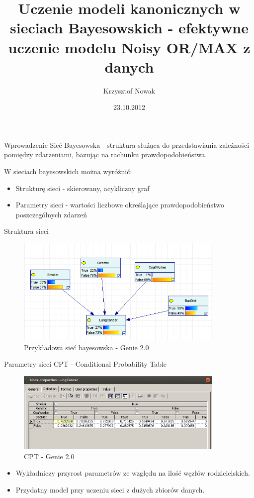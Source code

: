 \documentclass{beamer}
\title[Sieci Bayesowskie]{Uczenie modeli kanonicznych w sieciach Bayesowskich - efektywne uczenie modelu Noisy OR/MAX z danych}
\author{Krzysztof Nowak}
\institute{Politechnika Białostocka}
\date{23.10.2012}
\begin{document}
\begin{frame}
\titlepage
\end{frame}

\begin{frame}{Wprowadzenie}
	Sieć Bayesowska - struktura służąca do przedstawiania zależności pomiędzy zdarzeniami, bazując na rachunku prawdopodobieństwa.


	\pause W sieciach bayesowskich można wyróżnić:
	\begin{itemize}
		\pause \item Strukturę sieci - skierowany, acykliczny graf
		\pause \item Parametry sieci - wartości liczbowe określające prawdopodobieństwo poszczególnych zdarzeń
	\end{itemize}
	
\end{frame}

\begin{frame}{Struktura sieci}
	\begin{figure}[h!]
		\centering
		\includegraphics[width=10cm]{1.png}
		\caption{Przykładowa sieć bayesowska - Genie 2.0}
	\end{figure}
\end{frame}

\begin{frame}{Parametry sieci}
	CPT - Conditional Probability Table
	\begin{figure}[h!]
		\centering
		\includegraphics[width=10cm]{2.png}
		\caption{CPT - Genie 2.0}
	\end{figure}
	\begin{itemize}
		\item Wykładniczy przyrost parametrów ze względu na ilość węzłów rodzicielskich.
		\item Przydatny model przy uczeniu sieci z dużych zbiorów danych.
	\end{itemize}
\end{frame}
\end{document}
